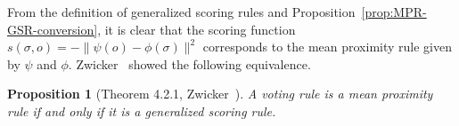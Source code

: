 \documentclass[10pt,letterpaper]{article}
\newcommand{\calL}{{\mathcal{L}}}
\newcommand{\rank}{{\calL(A)}}
\newcommand{\calO}{{\mathcal{O}}}
\newtheorem{proposition}{Proposition}
\begin{document}
From the definition of generalized scoring rules and Proposition~\ref{prop:MPR-GSR-conversion}, it is clear that the scoring function $s(\sigma,o) = -\|\psi(o)-\phi(\sigma)\|^2$ corresponds to the mean proximity rule given by $\psi$ and $\phi$. Zwicker~\cite{Zwicker08a} showed the following equivalence. 
\begin{proposition}[Theorem 4.2.1, Zwicker~\cite{Zwicker08a}]
A voting rule is a mean proximity rule if and only if it is a generalized scoring rule.
\label{prop:equiv}
\end{proposition}
%

\end{document}
